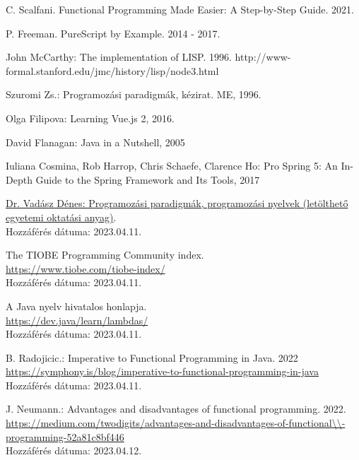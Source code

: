 \documentclass[12pt]{article}
\begin{document}
\newpage
\renewcommand{\refname}{Irodalomjegyzék}
\begin{thebibliography}{99}

C. Scalfani. Functional Programming Made Easier: A Step-by-Step Guide. 2021.

P. Freeman. PureScript by Example. 2014 - 2017.

John McCarthy: The implementation of LISP. 1996.
http://www-formal.stanford.edu/jmc/history/lisp/node3.html

Szuromi Zs.: Programozási paradigmák, kézirat. ME, 1996.

Olga Filipova: Learning Vue.js 2, 2016.

David Flanagan: Java in a Nutshell, 2005

Iuliana Cosmina, Rob Harrop, Chris Schaefe, Clarence Ho: Pro Spring 5: An In-Depth Guide to the Spring Framework and Its Tools, 2017

\href{https://web.archive.org/web/20150501083657/http://www.iit.uni-miskolc.hu/iitweb/export/sites/default/users/DVadasz/GEIAL401/Progpar-4-fejezet.pdf#}{Dr. Vadász Dénes: Programozási paradigmák, programozási nyelvek (letölthető egyetemi oktatási anyag)}.\\ Hozzáférés dátuma: 2023.04.11.

The TIOBE Programming Community index. \\ \url{https://www.tiobe.com/tiobe-index/} \\Hozzáférés dátuma: 2023.04.11.

A Java nyelv hivatalos honlapja. \\ \url{https://dev.java/learn/lambdas/}  \\Hozzáférés dátuma: 2023.04.11.

B. Radojicic.: Imperative to Functional Programming in Java. 2022\\
\url{https://symphony.is/blog/imperative-to-functional-programming-in-java} \\Hozzáférés dátuma: 2023.04.11.

J. Neumann.: Advantages and disadvantages of functional programming. 2022.\\
\url{https://medium.com/twodigits/advantages-and-disadvantages-of-functional\\-programming-52a81c8bf446}\\
Hozzáférés dátuma: 2023.04.12.


\end{thebibliography}
\end{document}
